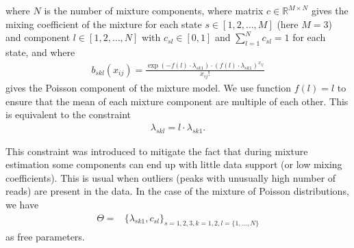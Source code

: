 \noindent
where $N$ is the number of mixture components, where matrix $c \in \mathbb{R}^{M \times N}$ gives the mixing coefficient of the mixture for each state $s \in [1, 2, \ldots, M]$ (here $M=3$) and component $l \in [1, 2, \ldots, N]$ with $c_{sl} \in [0,1]$ and $\sum_{l=1}^N c_{sl} = 1 $ for each state, and where
\begin{align*}
b_{skl}(x_{ij}) = \frac{\exp(-f(l) \cdot \lambda_{sk1}) \cdot ( f(l) \cdot \lambda_{sk1})^{x_{ij}}}{x_{ij}!}
\end{align*}
gives the Poisson component of the mixture model. 
We use function $f(l) = l$ to ensure that the mean of each mixture component are multiple of each other.
This is equivalent to the constraint 
\begin{align}
  \lambda_{skl} = l \cdot \lambda_{sk1} \label{eq_constraint_poisson}.
\end{align}

\noindent
This constraint was introduced to mitigate the fact that during mixture estimation some components can end up with little data support (or low mixing coefficients). 
This is usual when outliers (peaks with unusually high number of reads) are present in the data.
In the case of the mixture of Poisson distributions, we have
\begin{align*}
 \Theta =& \{\lambda_{sk1}, c_{sl}\}_{s = 1,2,3, k = 1,2, l=\{1, \ldots, N\}}
\end{align*}
as free parameters.

